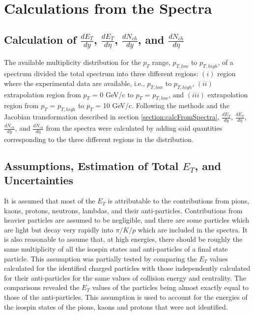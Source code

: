\section{Calculations from the Spectra}

\subsection{Calculation of $\frac{dE_{T}}{dy}$, $\frac{dE_{T}}{d\eta}$, $\frac{dN_{ch}}{dy}$, and $\frac{dN_{ch}}{d\eta}$}
The available multiplicity distribution for the $p_{T}$ range, $p_{T,low}$ to $p_{T,high}$, of a spectrum divided the total spectrum into three different regions: $(i)$ region where the experimental data are available, i.e., $p_{T,low}$ to $p_{T,high}$, $(ii)$ extrapolation region from $p_{T}$ = 0 GeV/c to $p_{T}$ = $p_{T,low}$, and $(iii)$ extrapolation region from $p_{T}$ = $p_{T,high}$ to $p_{T}$ = 10 GeV/c. Following the methods and the Jacobian transformation described in section \ref{section:calcFromSpectra}, $\frac{dE_{T}}{dy}$, $\frac{dE_{T}}{d\eta}$, $\frac{dN_{ch}}{dy}$, and $\frac{dN_{ch}}{d\eta}$ from the spectra were calculated by adding said quantities corresponding to the three different regions in the distribution.

\subsection{Assumptions, Estimation of Total $E_{T}$, and Uncertainties}\label{totalET}
It is assumed that most of the $E_{T}$ is attributable to the contributions from pions, kaons, protons, neutrons, lambdas, and their anti-particles. Contributions from heavier particles are assumed to be negligible, and there are some particles which are light but decay very rapidly into $\pi/K/p$ which are included in the spectra. It is also reasonable to assume that, at high energies, there should be roughly the same multiplicity of all the isospin states and anti-particles of a final state particle. This assumption was partially tested by comparing the $E_{T}$ values calculated for the identified charged particles with those independently calculated for their anti-particles for the same values of collision energy and centrality. The comparisons revealed the $E_{T}$ values of the particles being almost exactly equal to those of the anti-particles. This assumption is used to account for the energies of the isospin states of the pions, kaons and protons that were not identified.

